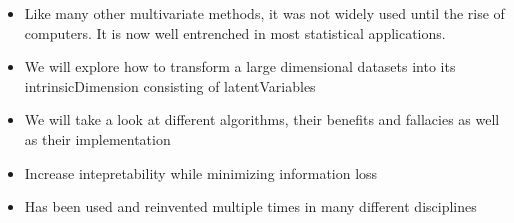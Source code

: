 \begin{itemize}
	\item Like many other multivariate methods, it was not widely used until the rise of computers. 
	It is now well entrenched in most statistical applications. \cite{Jolliffe2002book}
	\item We will explore how to transform a large dimensional datasets into its \gls{intrinsicDimension} consisting of \glspl{latentVariable}
	\item We will take a look at different algorithms, their benefits and fallacies as well as their implementation
	\item Increase intepretability while minimizing information loss \cite{jolliffe2016principal}
	\item Has been used and reinvented multiple times in many different disciplines \cite{jolliffe2016principal}
\end{itemize}
